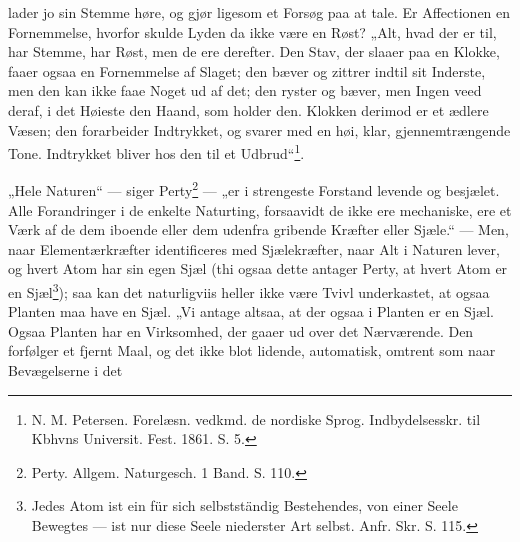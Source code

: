 \documentclass[12pt,a4paper]{book}
\renewcommand{\thefootnote}{\ifcase\value{footnote}\or *)\or **)\or ***)\fi}
\begin{document}
\setcounter{footnote}{0}
lader jo sin Stemme høre, og gjør ligesom et Forsøg paa at tale. Er Affectionen
en Fornemmelse, hvorfor skulde Lyden da ikke være en Røst? „Alt, hvad der er
til, har Stemme, har Røst, men de ere derefter. Den Stav, der slaaer paa en
Klokke, faaer ogsaa en Fornemmelse af Slaget; den bæver og zittrer indtil sit
Inderste, men den kan ikke faae Noget ud af det; den ryster og bæver, men Ingen
veed deraf, i det Høieste den Haand, som holder den. Klokken derimod er et
ædlere Væsen; den forarbeider Indtrykket, og svarer med en høi, klar,
gjennemtrængende Tone. Indtrykket bliver hos den til et
Udbrud“\footnote{N. M. Petersen. Forelæsn. vedkmd. de nordiske Sprog.
Indbydelsesskr. til Kbhvns Universit. Fest. 1861. S. 5.}.

„Hele Naturen“ --- siger Perty\footnote{Perty. Allgem. Naturgesch. 1 Band.
S. 110.} --- „er i strengeste Forstand levende og besjælet. Alle Forandringer i
de enkelte Naturting, forsaavidt de ikke ere mechaniske, ere et Værk af de dem
iboende eller dem udenfra gribende Kræfter eller Sjæle.“ --- Men, naar
Elementærkræfter identificeres med Sjælekræfter, naar Alt i Naturen lever, og
hvert Atom har sin egen Sjæl (thi ogsaa dette antager Perty, at hvert Atom er
en Sjæl\footnote{Jedes Atom ist ein für sich selbstständig Bestehendes, von
einer Seele Bewegtes --- ist nur diese Seele niederster Art selbst. Anfr. Skr.
S. 115.}); saa kan det naturligviis heller ikke være Tvivl underkastet, at
ogsaa Planten maa have en Sjæl. „Vi antage altsaa, at der ogsaa i Planten er en
Sjæl. Ogsaa Planten har en Virksomhed, der gaaer ud over det Nærværende. Den
forfølger et fjernt Maal, og det ikke blot lidende, automatisk, omtrent som
naar Bevægelserne i det
\end{document}
